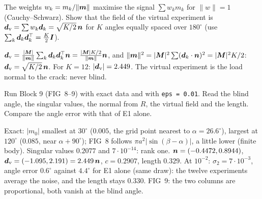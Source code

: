 \q The weights $w_k=m_k/\|\bm{m}\|$ maximise the signal $\sum w_km_k$ for
$\|w\|=1$ (Cauchy--Schwarz). Show that the field of the virtual experiment is
$\bm{d}_{\rm v}=\sum w_k\bm{d}_k=\sqrt{K/2}\,\bm{n}$ for $K$ angles equally spaced
over $180^\circ$ (use $\sum_k\bm{d}_k\bm{d}_k^{\top}=\tfrac K2\bm{I}$).
\begin{answer}
$\bm{d}_{\rm v}=\frac{|\bm{M}|}{\|\bm{m}\|}\sum_k\bm{d}_k\bm{d}_k^{\top}\bm{n}=\frac{|\bm{M}|K/2}
{\|\bm{m}\|}\bm{n}$, and $\|\bm{m}\|^2=|\bm{M}|^2\sum(\bm{d}_k\cdot\bm{n})^2=|\bm{M}|^2K/2$:
$\bm{d}_{\rm v}=\sqrt{K/2}\,\bm{n}$. For $K=12$: $|\bm{d}_{\rm v}|=2.449$. The
virtual experiment is the load normal to the crack: never blind.
\end{answer}

\qc Run Block 9 (FIG~8--9) with exact data and with \texttt{eps = 0.01}.
Read the blind angle, the singular values, the normal from $R$, the
virtual field and the length. Compare the angle error with that of E1 alone.
\begin{answer}
Exact: $|m_0|$ smallest at $30^\circ$ ($0.005$, the grid point nearest to
$\alpha=26.6^\circ$), largest at $120^\circ$ ($0.085$, near
$\alpha+90^\circ$); FIG~8 follows $\pi a^2|\sin(\beta-\alpha)|$, a little
lower (finite body). Singular values $0.2077$ and $7\cdot10^{-14}$: rank
one. $\bm{n}=(-0.4472,0.8944)$, $\bm{d}_{\rm v}=(-1.095,2.191)=2.449\,\bm{n}$,
$c=0.2907$, length $0.329$. At $10^{-2}$: $\sigma_2=7\cdot10^{-3}$, angle
error $0.6^\circ$ against $4.4^\circ$ for E1 alone (same draw): the twelve
experiments average the noise, and the length stays $0.330$. FIG~9: the
two columns are proportional, both vanish at the blind angle.
\end{answer}
